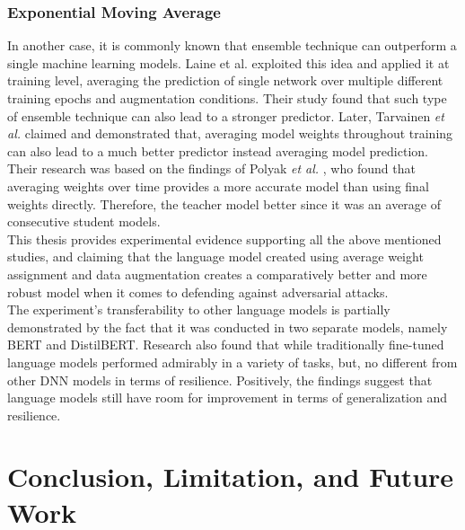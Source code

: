 \documentclass[%
	BCOR=8mm, %
	DIV=12,
	toc=bibliography, %
	toc=listof, %
	oneside, %
	egregdoesnotlikesansseriftitles, %
	]{scrbook}
\begin{document}
\subsection{Exponential Moving Average}
In another case, it is commonly known that ensemble technique can outperform a single machine learning models. Laine et al. \cite{laine_temporal_2017} exploited this idea and applied it at training level, averaging the prediction of single network over multiple different training epochs and augmentation conditions. Their study found that such type of ensemble technique can also lead to a stronger predictor. Later,  Tarvainen \textit{et al.} \cite{tarvainen_mean_2018} claimed and demonstrated that, averaging model weights throughout training can also lead to a much better predictor instead averaging model prediction. \\
Their research was based on the findings of Polyak \textit{et al.} \cite{polyak_acceleration_1992}, who found that averaging weights over time provides a more accurate model than using final weights directly. Therefore, the teacher model better since it was an average of consecutive student models. \\
This thesis provides experimental evidence supporting all the above mentioned studies, and claiming that the language model created using average weight assignment and data augmentation creates a comparatively better and more robust model when it comes to defending against adversarial attacks.\\
The experiment's transferability to other language models is partially demonstrated by the fact that it was conducted in two separate models, namely BERT and DistilBERT. Research also found that while traditionally fine-tuned language models performed admirably in a variety of tasks, but, no different from other DNN models in terms of resilience. Positively, the findings suggest that language models still have room for improvement in terms of generalization and resilience.
\chapter{Conclusion, Limitation, and Future Work}
\label{chapter:conclusion}
\end{document}

